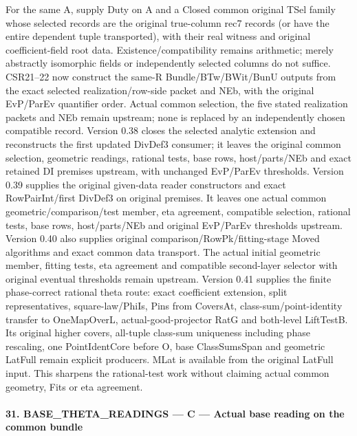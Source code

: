 For the same A, supply Duty on A and a Closed common original TSel family whose selected records are the original true-column rec7 records (or have the entire dependent tuple transported), with their real witness and original coefficient-field root data. Existence/\allowbreak{}compatibility remains arithmetic; merely abstractly isomorphic fields or independently selected columns do not suffice. CSR21–22 now construct the same-R Bundle/\allowbreak{}BTw/\allowbreak{}BWit/\allowbreak{}BunU outputs from the exact selected realization/\allowbreak{}row-side packet and NEb, with the original EvP/\allowbreak{}ParEv quantifier order. Actual common selection, the five stated realization packets and NEb remain upstream; none is replaced by an independently chosen compatible record. Version 0.38 closes the selected analytic extension and reconstructs the first updated DivDef3 consumer; it leaves the original common selection, geometric readings, rational tests, base rows, host/\allowbreak{}parts/\allowbreak{}NEb and exact retained DI premises upstream, with unchanged EvP/\allowbreak{}ParEv thresholds. Version 0.39 supplies the original given-data reader constructors and exact RowPairInt/\allowbreak{}first DivDef3 on original premises. It leaves one actual common geometric/\allowbreak{}comparison/\allowbreak{}test member, eta agreement, compatible selection, rational tests, base rows, host/\allowbreak{}parts/\allowbreak{}NEb and original EvP/\allowbreak{}ParEv thresholds upstream. Version 0.40 also supplies original comparison/\allowbreak{}RowPk/\allowbreak{}fitting-stage Moved algorithms and exact common data transport. The actual initial geometric member, fitting tests, eta agreement and compatible second-layer selector with original eventual thresholds remain upstream. Version 0.41 supplies the finite phase-correct rational theta route: exact coefficient extension, split representatives, square-law/\allowbreak{}PhiIs, Pins from CoversAt, class-sum/\allowbreak{}point-identity transfer to OneMapOverL, actual-good-projector RatG and both-level LiftTestB. Its original higher covers, all-tuple class-sum uniqueness including phase rescaling, one PointIdentCore before O, base ClassSumsSpan and geometric LatFull remain explicit producers. MLat is available from the original LatFull input. This sharpens the rational-test work without claiming actual common geometry, Fits or eta agreement.

\paragraph{31. BASE\_\allowbreak{}THETA\_\allowbreak{}READINGS — C — Actual base reading on the common bundle}

